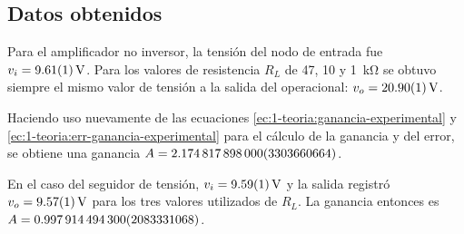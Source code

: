 \subsection{Datos obtenidos}

Para el amplificador no inversor, la tensión del nodo de entrada fue
$v_i = \SI{9.61 \pm 0.01}{\volt}$. Para los valores de resistencia 
$R_L$ de 47, 10 y \SI{1}{\kilo\ohm} se obtuvo siempre el mismo valor de
tensión a la salida del operacional: $v_o = \SI{20.90 \pm 0.01}{\volt}$.

Haciendo uso nuevamente de las ecuaciones \ref{ec:1-teoria:ganancia-experimental} y 
\ref{ec:1-teoria:err-ganancia-experimental} para el cálculo de la ganancia y del error, se
obtiene una ganancia $A = \num{2.174817898 \pm 0.003303660664}$.

En el caso del seguidor de tensión, $v_i = \SI{9.59 \pm 0.01}{\volt}$
y la salida registró $v_o = \SI{9.57 \pm 0.01}{\volt}$ para los tres valores
utilizados de $R_L$. La ganancia entonces es 
$A = \num{0.9979144943 \pm 0.002083331068}$.

